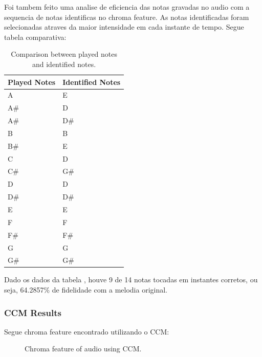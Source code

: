 \documentclass{article}
\begin{document}
	\newpage
	Foi tambem feito uma analise de eficiencia das notas gravadas no audio com a sequencia de notas identificas no chroma feature. As notas identificadas foram selecionadas atraves da maior intensidade em cada instante de tempo. Segue tabela comparativa:

	\begin{table}[h]
	 \begin{center}
	 \begin{tabular}{|l|l|}
	  \hline
	  Played Notes & Identified Notes \\
	  \hline
	  A  & E \\
	  A\#  & D \\
	  A\#  & D\# \\
	  B  & B \\
	  B\#  & E \\
	  C  & D \\
	  C\#  & G\# \\
	  D  & D \\
	  D\#  & D\# \\
	  E  & E \\
	  F  & F \\
	  F\#  & F\# \\
	  G  & G \\
	  G\#  & G\# \\
	  \hline
	 \end{tabular}
	\end{center}
	 \caption{Comparison between played notes and identified notes.}
	 \label{tab:table-1-sfft}
	\end{table}

	Dado os dados da tabela , houve 9 de 14 notas tocadas em instantes corretos, ou seja, 64.2857\% de fidelidade com a melodia original.


	\subsubsection{CCM Results}
	Segue chroma feature encontrado utilizando o CCM:
	
	\begin{figure}[h]
	 \centerline{}
	 \caption{Chroma feature of audio using CCM.}
	 \label{fig:1-ccm}
	\end{figure}	
\end{document}
